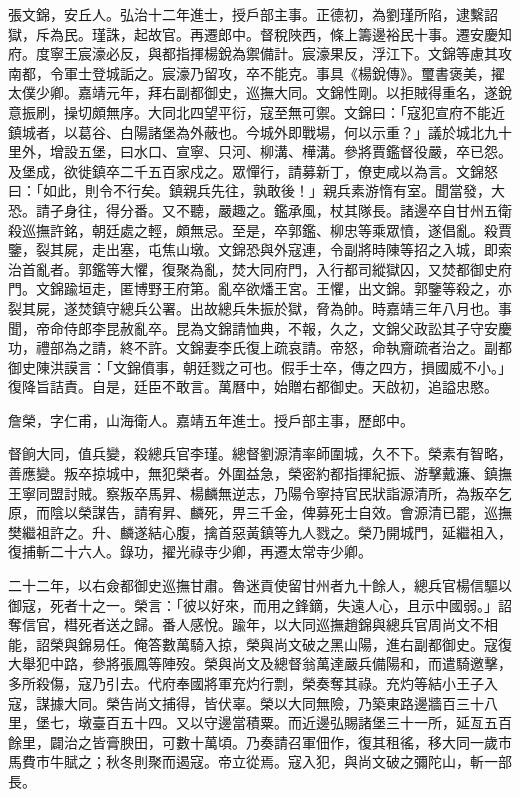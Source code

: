 \begin{pinyinscope}
張文錦，安丘人。弘治十二年進士，授戶部主事。正德初，為劉瑾所陷，逮繫詔獄，斥為民。瑾誅，起故官。再遷郎中。督稅陜西，條上籌邊裕民十事。遷安慶知府。度寧王宸濠必反，與都指揮楊銳為禦備計。宸濠果反，浮江下。文錦等慮其攻南都，令軍士登城詬之。宸濠乃留攻，卒不能克。事具《楊銳傳》。璽書褒美，擢太僕少卿。嘉靖元年，拜右副都御史，巡撫大同。文錦性剛。以拒賊得重名，遂銳意振刷，操切頗無序。大同北四望平衍，寇至無可禦。文錦曰：「寇犯宣府不能近鎮城者，以葛谷、白陽諸堡為外蔽也。今城外即戰場，何以示重？」議於城北九十里外，增設五堡，曰水口、宣寧、只河、柳溝、樺溝。參將賈鑑督役嚴，卒已怨。及堡成，欲徙鎮卒二千五百家戍之。眾憚行，請募新丁，僚吏咸以為言。文錦怒曰：「如此，則令不行矣。鎮親兵先往，孰敢後！」親兵素游惰有室。聞當發，大恐。請孑身往，得分番。又不聽，嚴趣之。鑑承風，杖其隊長。諸邊卒自甘州五衛殺巡撫許銘，朝廷處之輕，頗無忌。至是，卒郭鑑、柳忠等乘眾憤，遂倡亂。殺賈鑒，裂其屍，走出塞，屯焦山墩。文錦恐與外寇連，令副將時陳等招之入城，即索治首亂者。郭鑑等大懼，復聚為亂，焚大同府門，入行都司縱獄囚，又焚都御史府門。文錦踰垣走，匿博野王府第。亂卒欲燔王宮。王懼，出文錦。郭鑒等殺之，亦裂其屍，遂焚鎮守總兵公署。出故總兵朱振於獄，脅為帥。時嘉靖三年八月也。事聞，帝命侍郎李昆赦亂卒。昆為文錦請恤典，不報，久之，文錦父政訟其子守安慶功，禮部為之請，終不許。文錦妻李氏復上疏哀請。帝怒，命執齎疏者治之。副都御史陳洪謨言：「文錦僨事，朝廷戮之可也。假手士卒，傳之四方，損國威不小。」復降旨詰責。自是，廷臣不敢言。萬曆中，始贈右都御史。天啟初，追謚忠愍。

詹榮，字仁甫，山海衛人。嘉靖五年進士。授戶部主事，歷郎中。

督餉大同，值兵變，殺總兵官李瑾。總督劉源清率師圍城，久不下。榮素有智略，善應變。叛卒掠城中，無犯榮者。外圍益急，榮密約都指揮紀振、游擊戴濂、鎮撫王寧同盟討賊。察叛卒馬昇、楊麟無逆志，乃陽令寧持官民狀詣源清所，為叛卒乞原，而陰以榮謀告，請宥昇、麟死，畀三千金，俾募死士自效。會源清已罷，巡撫樊繼祖許之。升、麟遂結心腹，擒首惡黃鎮等九人戮之。榮乃開城門，延繼祖入，復捕斬二十六人。錄功，擢光祿寺少卿，再遷太常寺少卿。

二十二年，以右僉都御史巡撫甘肅。魯迷貢使留甘州者九十餘人，總兵官楊信驅以御寇，死者十之一。榮言：「彼以好來，而用之鋒鏑，失遠人心，且示中國弱。」詔奪信官，槥死者送之歸。番人感悅。踰年，以大同巡撫趙錦與總兵官周尚文不相能，詔榮與錦易任。俺答數萬騎入掠，榮與尚文破之黑山陽，進右副都御史。寇復大舉犯中路，參將張鳳等陣歿。榮與尚文及總督翁萬達嚴兵備陽和，而遣騎邀擊，多所殺傷，寇乃引去。代府奉國將軍充灼行剽，榮奏奪其祿。充灼等結小王子入寇，謀據大同。榮告尚文捕得，皆伏辜。榮以大同無險，乃築東路邊牆百三十八里，堡七，墩臺百五十四。又以守邊當積粟。而近邊弘賜諸堡三十一所，延亙五百餘里，闢治之皆膏腴田，可數十萬頃。乃奏請召軍佃作，復其租徭，移大同一歲市馬費市牛賦之；秋冬則聚而遏寇。帝立從焉。寇入犯，與尚文破之彌陀山，斬一部長。


\end{pinyinscope}
